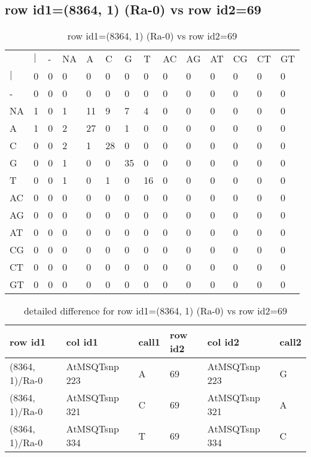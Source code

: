 \subsection{row id1=(8364, 1) (Ra-0) vs row id2=69}
\begin{center}
\begin{longtable}{|l|l|l|l|l|l|l|l|l|l|l|l|l|l|}
\caption{row id1=(8364, 1) (Ra-0) vs row id2=69} \label{table_dm594}\\
\hline
\\
\hline
&$|$&-&NA&A&C&G&T&AC&AG&AT&CG&CT&GT\\
$|$&0&0&0&0&0&0&0&0&0&0&0&0&0\\
-&0&0&0&0&0&0&0&0&0&0&0&0&0\\
NA&1&0&1&11&9&7&4&0&0&0&0&0&0\\
A&1&0&2&27&0&1&0&0&0&0&0&0&0\\
C&0&0&2&1&28&0&0&0&0&0&0&0&0\\
G&0&0&1&0&0&35&0&0&0&0&0&0&0\\
T&0&0&1&0&1&0&16&0&0&0&0&0&0\\
AC&0&0&0&0&0&0&0&0&0&0&0&0&0\\
AG&0&0&0&0&0&0&0&0&0&0&0&0&0\\
AT&0&0&0&0&0&0&0&0&0&0&0&0&0\\
CG&0&0&0&0&0&0&0&0&0&0&0&0&0\\
CT&0&0&0&0&0&0&0&0&0&0&0&0&0\\
GT&0&0&0&0&0&0&0&0&0&0&0&0&0\\
\hline
\end{longtable}
\end{center}

\begin{center}
\begin{longtable}{|l|l|l|l|l|l|}
\caption{detailed difference for row id1=(8364, 1) (Ra-0) vs row id2=69} \label{table_dm595}\\
\hline
row id1&col id1&call1&row id2&col id2&call2\\
\hline
(8364, 1)/Ra-0&AtMSQTsnp 223&A&69&AtMSQTsnp 223&G\\
(8364, 1)/Ra-0&AtMSQTsnp 321&C&69&AtMSQTsnp 321&A\\
(8364, 1)/Ra-0&AtMSQTsnp 334&T&69&AtMSQTsnp 334&C\\
\hline
\end{longtable}
\end{center}

